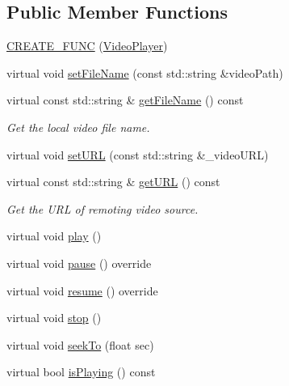 \subsection*{Public Member Functions}
\begin{DoxyCompactItemize}
\item 
\hyperlink{classexperimental_1_1ui_1_1VideoPlayer_a4030f5cbef6122fc7b377b21c641466b}{C\+R\+E\+A\+T\+E\+\_\+\+F\+U\+NC} (\hyperlink{classexperimental_1_1ui_1_1VideoPlayer}{Video\+Player})
\item 
virtual void \hyperlink{classexperimental_1_1ui_1_1VideoPlayer_a329b486cfda4e7ec8e22945f4f22ea62}{set\+File\+Name} (const std\+::string \&video\+Path)
\item 
virtual const std\+::string \& \hyperlink{classexperimental_1_1ui_1_1VideoPlayer_a82c2ba3d951b67d69420a83cd615d8b5}{get\+File\+Name} () const
\begin{DoxyCompactList}\small\item\em Get the local video file name. \end{DoxyCompactList}\item 
virtual void \hyperlink{classexperimental_1_1ui_1_1VideoPlayer_a2491bab42a29abbb44710aecb730b566}{set\+U\+RL} (const std\+::string \&\+\_\+video\+U\+RL)
\item 
virtual const std\+::string \& \hyperlink{classexperimental_1_1ui_1_1VideoPlayer_a30f50a39a6fac899967613866ec274c1}{get\+U\+RL} () const
\begin{DoxyCompactList}\small\item\em Get the U\+RL of remoting video source. \end{DoxyCompactList}\item 
virtual void \hyperlink{classexperimental_1_1ui_1_1VideoPlayer_af435ce3d899cc2a47f18f3256a8c0cd9}{play} ()
\item 
virtual void \hyperlink{classexperimental_1_1ui_1_1VideoPlayer_a420bb0e3cdf1e34d257f1a9f0cb25436}{pause} () override
\item 
virtual void \hyperlink{classexperimental_1_1ui_1_1VideoPlayer_a729841b1854104223900a8f6c711040a}{resume} () override
\item 
virtual void \hyperlink{classexperimental_1_1ui_1_1VideoPlayer_af28796de69c4a67f627945fe070861bf}{stop} ()
\item 
virtual void \hyperlink{classexperimental_1_1ui_1_1VideoPlayer_a10d60bf8f49a041a5d6700fede51aab5}{seek\+To} (float sec)
\item 
virtual bool \hyperlink{classexperimental_1_1ui_1_1VideoPlayer_a7b1ec8be02ad13696249b75e589586fc}{is\+Playing} () const

\end{DoxyCompactItemize}
